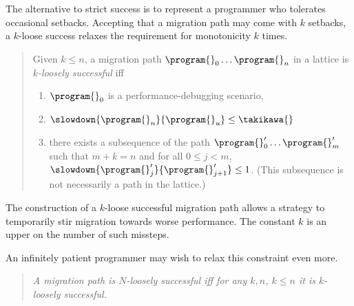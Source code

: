 The alternative to strict success is to represent a programmer who tolerates
occasional setbacks. Accepting that a migration path may come with $k$ setbacks,
a $k$-loose success relaxes the requirement for monotonicity $k$ times.

\begin{quote} \em

Given $k \leq n$, a migration path ${\program{}_0} \ldots {\program{}_n}$ in a
lattice  is \emph{$k$-loosely successful}
iff 
\begin{enumerate}
  \item  $\program{}_0$ is a performance-debugging scenario,
  \item $\slowdown{\program{}_n}{\program{}_u} \leq \takikawa{}$  
  \item there exists a subsequence of the path 
    ${\program{}^\prime_0} \ldots {\program{}^\prime_m}$ such that
     $m + k = n$ and
      for all $0 \leq j < m$,
      $\slowdown{\program{}^\prime_j}{\program{}^\prime_{j+1}} \leq 1$.
      (This subsequence is not necessarily a path in the lattice.)
  \end{enumerate} 
\end{quote}
The construction of a $k$-loose successful migration path allows a strategy to
temporarily stir migration towards worse performance. The constant $k$ is an
upper on the number of such missteps.

An infinitely patient programmer may wish to relax this constraint even more.

\begin{quote} \em
A migration path is $N$-loosely successful iff for any $k, n$, $k \leq n$ it is
\emph{$k$-loosely successful}. 
\end{quote}
